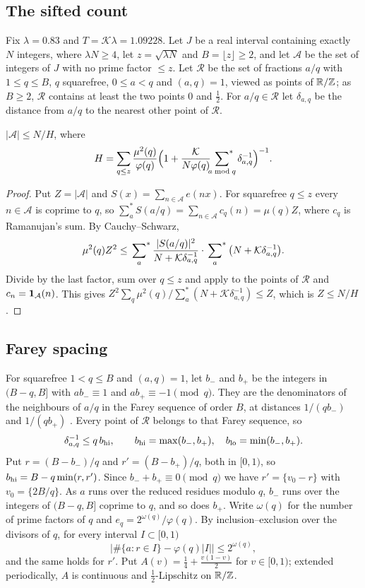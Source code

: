 \documentclass[11pt,colorlinks]{charlie}
\newcommand{\cR}{\mathcal R}
\newcommand{\cA}{\mathcal A}
\newcommand{\Ka}{\mathcal K}
\begin{document}
\subsection{The sifted count}
Fix $\lambda=0.83$ and $T=\Ka\lambda=1.09228$. Let $J$ be a real interval containing exactly $N$ integers, where $\lambda N\ge4$, let $z=\sqrt{\lambda N}$ and $B=\lfloor z\rfloor\ge2$, and let $\cA$ be the set of integers of $J$ with no prime factor $\le z$. Let $\cR$ be the set of fractions $a/q$ with $1\le q\le B$, $q$ squarefree, $0\le a<q$ and $(a,q)=1$, viewed as points of $\mathbb{R}/\mathbb{Z}$; as $B\ge2$, $\cR$ contains at least the two points $0$ and $\frac12$. For $a/q\in\cR$ let $\delta_{a,q}$ be the distance from $a/q$ to the nearest other point of $\cR$.

\begin{lemma}\label{lem:sifted}
$|\cA|\le N/H$, where
\[
 H=\sum_{q\le z}\frac{\mu^2(q)}{\varphi(q)}\Big(1+\frac{\Ka}{N\varphi(q)}\sideset{}{^*}\sum_{a\bmod q}\delta_{a,q}^{-1}\Big)^{-1}.
\]
\end{lemma}
\begin{proof}
Put $Z=|\cA|$ and $S(x)=\sum_{n\in\cA}e(nx)$. For squarefree $q\le z$ every $n\in\cA$ is coprime to $q$, so $\sum^*_aS(a/q)=\sum_{n\in\cA}c_q(n)=\mu(q)Z$, where $c_q$ is Ramanujan's sum. By Cauchy--Schwarz,
\[
 \mu^2(q)Z^2\le\sideset{}{^*}\sum_a\frac{|S(a/q)|^2}{N+\Ka\delta_{a,q}^{-1}}\cdot\sideset{}{^*}\sum_a\big(N+\Ka\delta_{a,q}^{-1}\big).
\]
Divide by the last factor, sum over $q\le z$ and apply  to the points of $\cR$ and $c_n=\one_\cA(n)$. This gives $Z^2\sum_q\mu^2(q)/\sum^*_a(N+\Ka\delta_{a,q}^{-1})\le Z$, which is $Z\le N/H$.
\end{proof}

\subsection{Farey spacing}
For squarefree $1<q\le B$ and $(a,q)=1$, let $b_-$ and $b_+$ be the integers in $(B-q,B]$ with $ab_-\equiv1$ and $ab_+\equiv-1\pmod q$. They are the denominators of the neighbours of $a/q$ in the Farey sequence of order $B$, at distances $1/(qb_-)$ and $1/(qb_+)$ \cite[Ch.~III]{HW}. Every point of $\cR$ belongs to that Farey sequence, so
\begin{equation}\label{eq:delta}
 \delta_{a,q}^{-1}\le q\,b_{\rm hi},\qquad b_{\rm hi}=\max(b_-,b_+),\quad b_{\rm lo}=\min(b_-,b_+).
\end{equation}
Put $r=(B-b_-)/q$ and $r'=(B-b_+)/q$, both in $[0,1)$, so $b_{\rm hi}=B-q\min(r,r')$. Since $b_-+b_+\equiv0\pmod q$ we have $r'=\{v_0-r\}$ with $v_0=\{2B/q\}$. As $a$ runs over the reduced residues modulo $q$, $b_-$ runs over the integers of $(B-q,B]$ coprime to $q$, and so does $b_+$. Write $\omega(q)$ for the number of prime factors of $q$ and $e_q=2^{\omega(q)}/\varphi(q)$. By inclusion--exclusion over the divisors of $q$, for every interval $I\subset[0,1)$
\begin{equation}\label{eq:discrepancy}
 \Big|\#\{a:r\in I\}-\varphi(q)|I|\Big|\le2^{\omega(q)},
\end{equation}
and the same holds for $r'$. Put $A(v)=\frac14+\frac{v(1-v)}2$ for $v\in[0,1)$; extended periodically, $A$ is continuous and $\frac12$-Lipschitz on $\mathbb{R}/\mathbb{Z}$.
\end{document}
